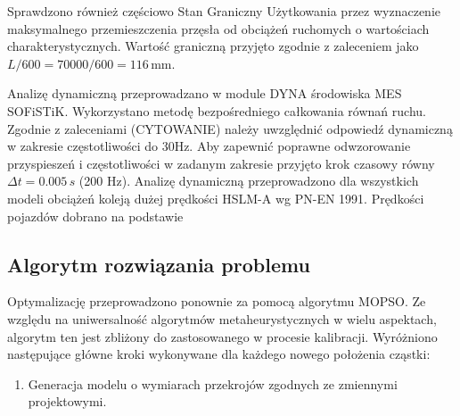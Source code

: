 Sprawdzono również częściowo Stan Graniczny Użytkowania przez wyznaczenie maksymalnego przemieszczenia przęsła od obciążeń ruchomych o wartościach charakterystycznych. Wartość graniczną przyjęto zgodnie z zaleceniem jako $L/600=70000/600=116\,\text{mm}$.

Analizę dynamiczną przeprowadzano w module DYNA środowiska MES SOFiSTiK. Wykorzystano metodę bezpośredniego całkowania równań ruchu. Zgodnie z zaleceniami (CYTOWANIE) należy uwzględnić odpowiedź dynamiczną w zakresie częstotliwości do 30Hz. Aby zapewnić poprawne odwzorowanie przyspieszeń i częstotliwości w zadanym zakresie przyjęto krok czasowy równy $\Delta t = 0.005\,s$ (200 Hz).
Analizę dynamiczną przeprowadzono dla wszystkich modeli obciążeń koleją dużej prędkości HSLM-A wg PN-EN 1991. Prędkości pojazdów dobrano na podstawie 




\subsection{Algorytm rozwiązania problemu}
Optymalizację przeprowadzono ponownie za pomocą algorytmu MOPSO. Ze względu na uniwersalność algorytmów metaheurystycznych w wielu aspektach, algorytm ten jest zbliżony do zastosowanego w procesie kalibracji. Wyróżniono następujące główne kroki wykonywane dla każdego nowego położenia cząstki:
\begin{enumerate}
	\item Generacja modelu o wymiarach przekrojów zgodnych ze zmiennymi projektowymi.
\end{enumerate}
























